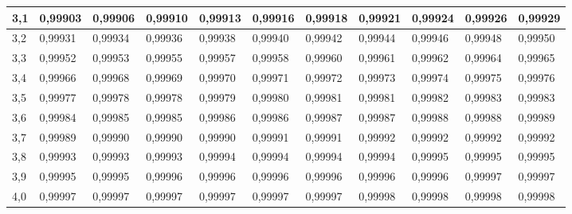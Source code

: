\documentclass[12pt,a4paper,twocolumn]{article}
\begin{document}
\begin{tabular}{l|l|l|l|l|l|l|l|l|l|l}
3,1 & 0,99903 & 0,99906 & 0,99910 & 0,99913 & 0,99916 & 0,99918 & 0,99921 & 0,99924 & 0,99926 & 0,99929\\ \hline
3,2 & 0,99931 & 0,99934 & 0,99936 & 0,99938 & 0,99940 & 0,99942 & 0,99944 & 0,99946 & 0,99948 & 0,99950\\ \hline
3,3 & 0,99952 & 0,99953 & 0,99955 & 0,99957 & 0,99958 & 0,99960 & 0,99961 & 0,99962 & 0,99964 & 0,99965\\ \hline
3,4 & 0,99966 & 0,99968 & 0,99969 & 0,99970 & 0,99971 & 0,99972 & 0,99973 & 0,99974 & 0,99975 & 0,99976\\ \hline
3,5 & 0,99977 & 0,99978 & 0,99978 & 0,99979 & 0,99980 & 0,99981 & 0,99981 & 0,99982 & 0,99983 & 0,99983\\ \hline
3,6 & 0,99984 & 0,99985 & 0,99985 & 0,99986 & 0,99986 & 0,99987 & 0,99987 & 0,99988 & 0,99988 & 0,99989\\ \hline
3,7 & 0,99989 & 0,99990 & 0,99990 & 0,99990 & 0,99991 & 0,99991 & 0,99992 & 0,99992 & 0,99992 & 0,99992\\ \hline
3,8 & 0,99993 & 0,99993 & 0,99993 & 0,99994 & 0,99994 & 0,99994 & 0,99994 & 0,99995 & 0,99995 & 0,99995\\ \hline
3,9 & 0,99995 & 0,99995 & 0,99996 & 0,99996 & 0,99996 & 0,99996 & 0,99996 & 0,99996 & 0,99997 & 0,99997\\ \hline
4,0 & 0,99997 & 0,99997 & 0,99997 & 0,99997 & 0,99997 & 0,99997 & 0,99998 & 0,99998 & 0,99998 & 0,99998

\end{tabular}
\end{document}
